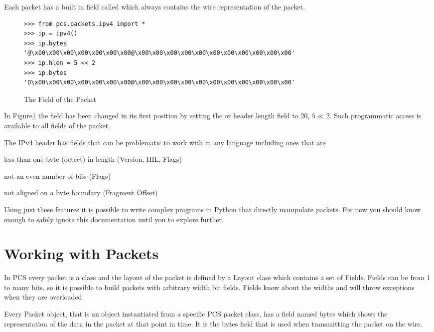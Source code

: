 \documentclass[11pt]{article}
\begin{document}
Each packet has a built in field called  which always contains
the wire representation of the packet.  

\begin{figure}
  \centering
\begin{Verbatim}
>>> from pcs.packets.ipv4 import *
>>> ip = ipv4()
>>> ip.bytes
'@\x00\x00\x00\x00\x00\x00\x00@\x00\x00\x00\x00\x00\x00\x00\x00\x00\x00\x00'
>>> ip.hlen = 5 << 2
>>> ip.bytes
'D\x00\x00\x00\x00\x00\x00\x00@\x00\x00\x00\x00\x00\x00\x00\x00\x00\x00\x00'
\end{Verbatim}
  \caption{The  Field of the Packet}
  \label{fig:bytes-field}
\end{figure}

In Figure\ref{fig:bytes-field} the  field has been
changed in its first position by setting the  or header
length field to 20, $5 \ll 2$.  Such programmatic access is available
to all fields of the packet.

The IPv4 header has fields that can be problematic to work with in any
language including ones that are

\begin{list}{fig:ipheadfeatures}{}
\item less than one byte (octect) in length (Version, IHL, Flags)
\item not an even number of bits (Flags)
\item not aligned on a byte boundary (Fragment Offset)
\end{list}

Using just these features it is possible to write complex programs in
Python that directly manipulate packets.  For now you should know
enough to safely ignore this documentation until you to explore further.

\section{Working with Packets}

In PCS every packet is a class and the layout of the packet is defined
by a Layout class which contains a set of Fields.  Fields can be from
1 to many bits, so it is possible to build packets with arbitrary
width bit fields.  Fields know about the widths and will throw
exceptions when they are overloaded.

Every Packet object, that is an object instantiated from a specific
PCS packet class, has a field named bytes which shows the
representation of the data in the packet at that point in time.  It is
the bytes field that is used when transmitting the packet on the wire.
\end{document}
